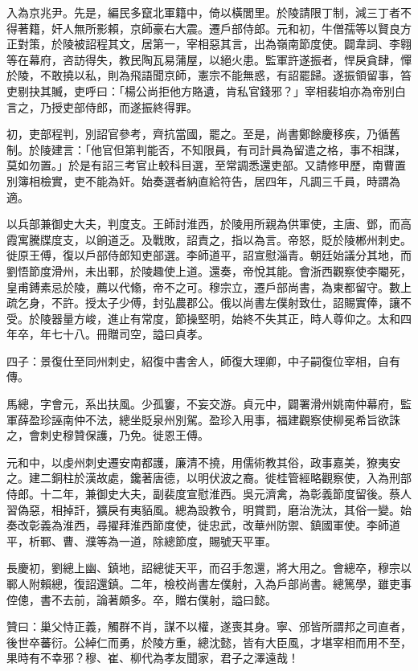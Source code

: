 \begin{pinyinscope}
 入為京兆尹。先是，編民多竄北軍籍中，倚以橫閭里。於陵請限丁制，減三丁者不得著籍，奸人無所影賴，京師豪右大震。遷戶部侍郎。元和初，牛僧孺等以賢良方正對策，於陵被詔程其文，居第一，宰相惡其言，出為嶺南節度使。闢韋詞、李翱等在幕府，咨訪得失，教民陶瓦易蒲屋，以絕火患。監軍許遂振者，悍戾貪肆，憚於陵，不敢撓以私，則為飛語聞京師，憲宗不能無惑，有詔罷歸。遂振領留事，笞吏剔抉其贓，吏呼曰：「楊公尚拒他方賂遺，肯私官錢邪？」宰相裴垍亦為帝別白言之，乃授吏部侍郎，而遂振終得罪。



 初，吏部程判，別詔官參考，齊抗當國，罷之。至是，尚書鄭餘慶移疾，乃循舊制。於陵建言：「他官但第判能否，不知限員，有司計員為留遣之格，事不相謀，莫如勿置。」於是有詔三考官止較科目選，至常調悉還吏部。又請修甲歷，南曹置別簿相檢實，吏不能為奸。始奏選者納直給符告，居四年，凡調三千員，時謂為適。



 以兵部兼御史大夫，判度支。王師討淮西，於陵用所親為供軍使，主唐、鄧，而高霞寓騰牒度支，以餉道乏。及戰敗，詔責之，指以為言。帝怒，貶於陵郴州刺史。徙原王傅，復以戶部侍郎知吏部選。李師道平，詔宣慰淄青。朝廷始議分其地，而劉悟節度滑州，未出鄆，於陵趣使上道。還奏，帝悅其能。會浙西觀察使李閹死，皇甫鎛素忌於陵，薦以代翛，帝不之可。穆宗立，遷戶部尚書，為東都留守。數上疏乞身，不許。授太子少傅，封弘農郡公。俄以尚書左僕射致仕，詔賜實俸，讓不受。於陵器量方峻，進止有常度，節操堅明，始終不失其正，時人尊仰之。太和四年卒，年七十八。冊贈司空，謚曰貞孝。



 四子：景復仕至同州刺史，紹復中書舍人，師復大理卿，中子嗣復位宰相，自有傳。



 馬總，字會元，系出扶風。少孤窶，不妄交游。貞元中，闢署滑州姚南仲幕府，監軍薛盈珍誣南仲不法，總坐貶泉州別駕。盈珍入用事，福建觀察使柳冕希旨欲誅之，會刺史穆贊保護，乃免。徙恩王傅。



 元和中，以虔州刺史遷安南都護，廉清不撓，用儒術教其俗，政事嘉美，獠夷安之。建二銅柱於漢故處，鑱著唐德，以明伏波之裔。徙桂管經略觀察使，入為刑部侍郎。十二年，兼御史大夫，副裴度宣慰淮西。吳元濟禽，為彰義節度留後。蔡人習偽惡，相掉訐，獷戾有夷貊風。總為設教令，明賞罰，磨治洗汰，其俗一變。始奏改彰義為淮西，尋擢拜淮西節度使，徙忠武，改華州防禦、鎮國軍使。李師道平，析鄆、曹、濮等為一道，除總節度，賜號天平軍。



 長慶初，劉總上幽、鎮地，詔總徙天平，而召手怱還，將大用之。會總卒，穆宗以鄆人附賴總，復詔還鎮。二年，檢校尚書左僕射，入為戶部尚書。總篤學，雖吏事倥傯，書不去前，論著頗多。卒，贈右僕射，謚曰懿。



 贊曰：巢父恃正義，觸群不肖，謀不以權，遂喪其身。寧、邠皆所謂邦之司直者，後世卒蕃衍。公綽仁而勇，於陵方重，總沈懿，皆有大臣風，才堪宰相而用不至，果時有不幸邪？穆、崔、柳代為孝友聞家，君子之澤遠哉！



\end{pinyinscope}